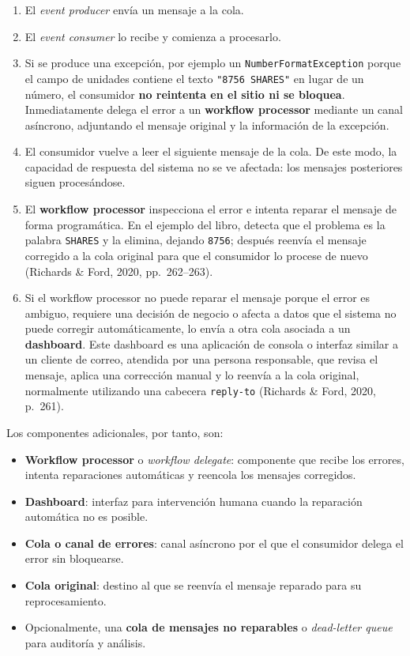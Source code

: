 \documentclass[12pt,a4paper]{article}
\begin{document}
\begin{enumerate}[label=\arabic*.,leftmargin=*]
  \item El \emph{event producer} envía un mensaje a la cola.
  \item El \emph{event consumer} lo recibe y comienza a procesarlo.
  \item Si se produce una excepción, por ejemplo un \texttt{NumberFormatException} porque el campo de unidades contiene el texto \texttt{"8756 SHARES"} en lugar de un número, el consumidor \textbf{no reintenta en el sitio ni se bloquea}. Inmediatamente delega el error a un \textbf{workflow processor} mediante un canal asíncrono, adjuntando el mensaje original y la información de la excepción.
  \item El consumidor vuelve a leer el siguiente mensaje de la cola. De este modo, la capacidad de respuesta del sistema no se ve afectada: los mensajes posteriores siguen procesándose.
  \item El \textbf{workflow processor} inspecciona el error e intenta reparar el mensaje de forma programática. En el ejemplo del libro, detecta que el problema es la palabra \texttt{SHARES} y la elimina, dejando \texttt{8756}; después reenvía el mensaje corregido a la cola original para que el consumidor lo procese de nuevo (Richards \& Ford, 2020, pp.~262--263).
  \item Si el workflow processor no puede reparar el mensaje porque el error es ambiguo, requiere una decisión de negocio o afecta a datos que el sistema no puede corregir automáticamente, lo envía a otra cola asociada a un \textbf{dashboard}. Este dashboard es una aplicación de consola o interfaz similar a un cliente de correo, atendida por una persona responsable, que revisa el mensaje, aplica una corrección manual y lo reenvía a la cola original, normalmente utilizando una cabecera \texttt{reply-to} (Richards \& Ford, 2020, p.~261).
\end{enumerate}

Los componentes adicionales, por tanto, son:

\begin{itemize}[label=$\cdot$]
  \item \textbf{Workflow processor} o \emph{workflow delegate}: componente que recibe los errores, intenta reparaciones automáticas y reencola los mensajes corregidos.
  \item \textbf{Dashboard}: interfaz para intervención humana cuando la reparación automática no es posible.
  \item \textbf{Cola o canal de errores}: canal asíncrono por el que el consumidor delega el error sin bloquearse.
  \item \textbf{Cola original}: destino al que se reenvía el mensaje reparado para su reprocesamiento.
  \item Opcionalmente, una \textbf{cola de mensajes no reparables} o \emph{dead-letter queue} para auditoría y análisis.
\end{itemize}
\end{document}
